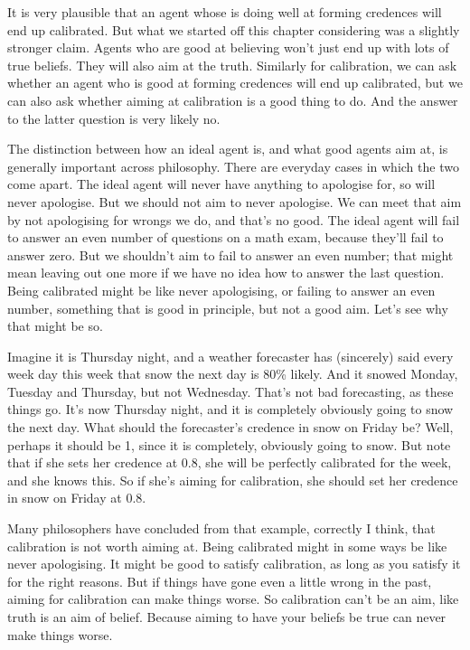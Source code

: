 It is very plausible that an agent whose is doing well at forming credences will end up calibrated. But what we started off this chapter considering was a slightly stronger claim. Agents who are good at believing won't just end up with lots of true beliefs. They will also aim at the truth. Similarly for calibration, we can ask whether an agent who is good at forming credences will end up calibrated, but we can also ask whether aiming at calibration is a good thing to do. And the answer to the latter question is very likely no.

The distinction between how an ideal agent is, and what good agents aim at, is generally important across philosophy. There are everyday cases in which the two come apart. The ideal agent will never have anything to apologise for, so will never apologise. But we should not aim to never apologise. We can meet that aim by not apologising for wrongs we do, and that's no good. The ideal agent will fail to answer an even number of questions on a math exam, because they'll fail to answer zero. But we shouldn't aim to fail to answer an even number; that might mean leaving out one more if we have no idea how to answer the last question. Being calibrated might be like never apologising, or failing to answer an even number, something that is good in principle, but not a good aim. Let's see why that might be so.

Imagine it is Thursday night, and a weather forecaster has (sincerely) said every week day this week that snow the next day is 80\% likely. And it snowed Monday, Tuesday and Thursday, but not Wednesday. That's not bad forecasting, as these things go. It's now Thursday night, and it is completely obviously going to snow the next day. What should the forecaster's credence in snow on Friday be? Well, perhaps it should be 1, since it is completely, obviously going to snow. But note that if she sets her credence at 0.8, she will be perfectly calibrated for the week, and she knows this. So if she's aiming for calibration, she should set her credence in snow on Friday at 0.8. 

Many philosophers have concluded from that example, correctly I think, that calibration is not worth aiming at. Being calibrated might in some ways be like never apologising. It might be good to satisfy calibration, as long as you satisfy it for the right reasons. But if things have gone even a little wrong in the past, aiming for calibration can make things worse. So calibration can't be an aim, like truth is an aim of belief. Because aiming to have your beliefs be true can never make things worse.

